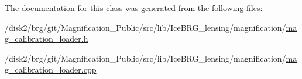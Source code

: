 The documentation for this class was generated from the following files\-:\begin{DoxyCompactItemize}
\item 
/disk2/brg/git/\-Magnification\-\_\-\-Public/src/lib/\-Ice\-B\-R\-G\-\_\-lensing/magnification/\hyperlink{mag__calibration__loader_8h}{mag\-\_\-calibration\-\_\-loader.\-h}\item 
/disk2/brg/git/\-Magnification\-\_\-\-Public/src/lib/\-Ice\-B\-R\-G\-\_\-lensing/magnification/\hyperlink{mag__calibration__loader_8cpp}{mag\-\_\-calibration\-\_\-loader.\-cpp}\end{DoxyCompactItemize}
